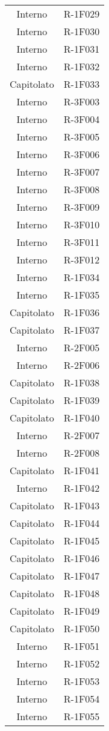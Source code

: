 \begin{tabularx}{\textwidth}{c|c}
		Interno & R-1F029 \\
		Interno & R-1F030 \\
		Interno & R-1F031 \\
		Interno & R-1F032 \\
		Capitolato & R-1F033 \\
		Interno & R-3F003 \\
		Interno & R-3F004 \\
		Interno & R-3F005 \\
		Interno & R-3F006 \\
		Interno & R-3F007 \\
		Interno & R-3F008 \\
		Interno & R-3F009 \\
		Interno & R-3F010 \\
		Interno & R-3F011 \\
		Interno & R-3F012 \\
		Interno & R-1F034 \\
		Interno & R-1F035 \\
		Capitolato & R-1F036 \\
		Capitolato & R-1F037 \\
		Interno & R-2F005 \\
		Interno & R-2F006 \\
		Capitolato & R-1F038 \\
		Capitolato & R-1F039 \\
		Capitolato & R-1F040 \\
		Interno & R-2F007 \\
		Interno & R-2F008 \\
		Capitolato & R-1F041 \\
		Interno & R-1F042 \\
		Capitolato & R-1F043 \\
		Capitolato & R-1F044 \\
		Capitolato & R-1F045 \\
		Capitolato & R-1F046 \\
		Capitolato & R-1F047 \\
		Capitolato & R-1F048 \\
		Capitolato & R-1F049 \\
		Capitolato & R-1F050 \\
		Interno & R-1F051 \\
		Interno & R-1F052 \\
		Interno & R-1F053 \\
		Interno & R-1F054 \\
		Interno & R-1F055 \\

\end{tabularx}
